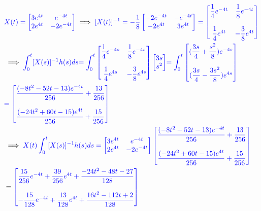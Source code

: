 \documentclass[a4paper]{article}
\begin{document}
\begin{align*}
\notag
&\textcolor{blue}{X(t)= \begin{bmatrix} 3e^{4t} & e^{-4t}\\ 2e^{4t} & -2e^{-4t} \end{bmatrix}} \implies \textcolor{blue}{[X(t)]^{-1}= -\dfrac{1}{8} \begin{bmatrix} -2e^{-4t} & -e^{-4t}\\ -2e^{4t} & 3e^{4t} \end{bmatrix}= \begin{bmatrix} 
 \dfrac{1}{4}e^{-4t} & \dfrac{1}{8}e^{-4t}\\\\ \dfrac{1}{4}e^{4t} & -\dfrac{3}{8}e^{4t} \end{bmatrix} }\\
&\implies  \textcolor{blue}
{\int_{0}^{t}[X(s)]^{-1}h(s) ds }\textcolor{blue}{=\int_{0}^{t}\begin{bmatrix} 
 \dfrac{1}{4}e^{-4s} & \dfrac{1}{8}e^{-4s}\\\\ \dfrac{1}{4}e^{4s} & -\dfrac{3}{8}e^{4s} \end{bmatrix} \begin{bmatrix} 3s \\ s^{2}\end{bmatrix}}
 \textcolor{blue}{= \int_{0}^{t}\begin{bmatrix} (\dfrac{3s}{4} +\dfrac{s^{2}}{8})e^{-4s}\\\\ (\dfrac{3s}{4} -\dfrac{3s^{2}}{8})e^{4s} \end{bmatrix}}\\
 &\textcolor{blue}{= \begin{bmatrix} \dfrac{(-8t^{2}-52t-13)e^{-4t}}{256}+\dfrac{13}{256}\\\\ \dfrac{(-24t^{2}+60t-15)e^{4t}}{256}+\dfrac{15}{256}\end{bmatrix}} 
 \\ &\implies \textcolor{blue}
{X(t)\int_{0}^{t}[X(s)]^{-1}h(s) ds =\begin{bmatrix} 3e^{4t} & e^{-4t}\\ 2e^{4t} & -2e^{-4t} \end{bmatrix}\begin{bmatrix} \dfrac{(-8t^{2}-52t-13)e^{-4t}}{256}+\dfrac{13}{256}\\\\ \dfrac{(-24t^{2}+60t-15)e^{4t}}{256}+\dfrac{15}{256}\end{bmatrix}}\\ 
&=\textcolor{blue}{
\begin{bmatrix} \dfrac{15}{256}e^{-4t}+ \dfrac{39}{256}e^{4t}+\dfrac{-24t^{2}-48t-27}{128}  \\\\ -\dfrac{15}{128}e^{-4t}+\dfrac{13}{128}e^{4t}+\dfrac{16t^{2}-112t+2}{128}\end{bmatrix}}
 \end{align*}
\end{document}
